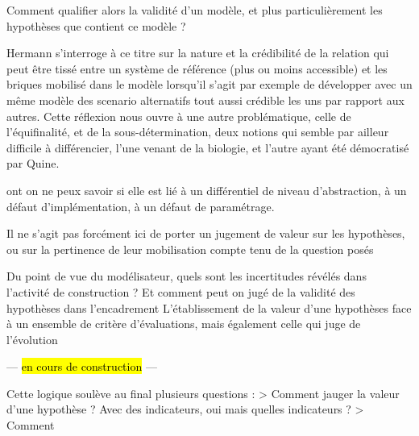 


Comment qualifier alors la validité d'un modèle, et plus particulièrement les hypothèses que contient ce modèle ?

Hermann s'interroge à ce titre sur la nature et la crédibilité de la relation qui peut être tissé entre un système de référence (plus ou moins accessible) et les briques mobilisé dans le modèle lorsqu'il s'agit par exemple de développer avec un même modèle des scenario alternatifs tout aussi crédible les uns par rapport aux autres. Cette réflexion nous ouvre à une autre problématique, celle de l'équifinalité, et de la sous-détermination, deux notions qui semble par ailleur difficile à différencier, l'une venant de la biologie, et l'autre ayant été démocratisé par Quine.



ont on ne peux savoir si elle est lié à un différentiel de niveau d'abstraction, à un défaut d'implémentation, à un défaut de paramétrage.

Il ne s'agit pas forcément ici de porter un jugement de valeur sur les hypothèses, ou sur la pertinence de leur mobilisation compte tenu de la question posés


Du point de vue du modélisateur, quels sont les incertitudes révélés dans l'activité de construction ? Et comment peut on jugé de la validité des hypothèses dans l'encadrement L'établissement de la valeur d'une hypothèses face à un ensemble de critère d'évaluations, mais également celle qui juge de l'évolution

--- \hl{en cours de construction} ---

Cette logique soulève au final plusieurs questions :
> Comment jauger la valeur d'une hypothèse ? Avec des indicateurs, oui mais quelles indicateurs ?
> Comment



